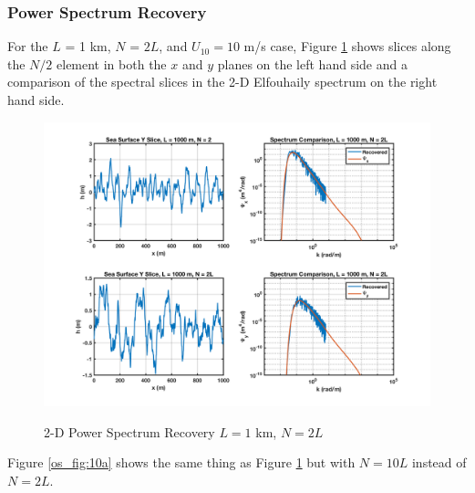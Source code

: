 \subsubsection {Power Spectrum Recovery}
For the $L$ = 1 km, $N$ = $2L$, and $U_{10} = 10$ m/s case, Figure \ref{os_fig:10} shows slices along the $N/2$ element in both the $x$ and $y$ planes on the left hand side and a comparison of the spectral slices in the 2-D Elfouhaily spectrum on the right hand side. 

\begin{figure}[H]
  \begin{center}
\includegraphics[width=6in]{../media/Ocean_Surface/sea_surface_2d_slices_1000.png}
  \end{center}
  \renewcommand{\baselinestretch}{1} \small\normalsize
  \begin{quote}
    \caption[2-D Power Spectrum Recovery $L = 1$ km, $N = 2L$]{2-D Power Spectrum Recovery $L = 1$ km, $N = 2L$\label{os_fig:10}}
  \end{quote}
\end{figure}
\renewcommand{\baselinestretch}{2} \small\normalsize

Figure \ref{os_fig:10a} shows the same thing as Figure \ref{os_fig:10} but with $N=10L$ instead of $N = 2L$.

